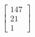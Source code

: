\documentclass[preview]{standalone}
\begin{document}
\begin{align*}
\begin{bmatrix}147\\21\\1\end{bmatrix}
\end{align*}
\end{document}
